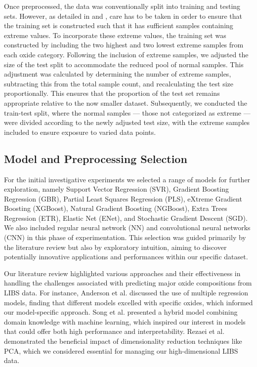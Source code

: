 Once preprocessed, the data was conventionally split into training and testing sets. 
However, as detailed in \citet{p9} and \cite{cleggRecalibrationMarsScience2017}, care has to be taken in order to ensure that the training set is constructed such that it has sufficient samples containing extreme values.
To incorporate these extreme values, the training set was constructed by including the two highest and two lowest extreme samples from each oxide category.
Following the inclusion of extreme samples, we adjusted the size of the test split to accommodate the reduced pool of normal samples. 
This adjustment was calculated by determining the number of extreme samples, subtracting this from the total sample count, and recalculating the test size proportionally. 
This ensures that the proportion of the test set remains appropriate relative to the now smaller dataset. 
Subsequently, we conducted the train-test split, where the normal samples --- those not categorized as extreme --- were divided according to the newly adjusted test size, with the extreme samples included to ensure exposure to varied data points.

\subsection{Model and Preprocessing Selection}
For the initial investigative experiments we selected a range of models for further exploration, namely Support Vector Regression (SVR), Gradient Boosting Regression (GBR), Partial Least Squares Regression (PLS), eXtreme Gradient Boosting (XGBoost), Natural Gradient Boosting (NGBoost), Extra Trees Regression (ETR), Elastic Net (ENet), and Stochastic Gradient Descent (SGD). 
We also included regular neural network (NN) and convolutional neural networks (CNN) in this phase of experimentation. 
This selection was guided primarily by the literature review but also by exploratory intuition,
aiming to discover potentially innovative applications and performances within our specific dataset.

Our literature review highlighted various approaches and their effectiveness in handling the challenges associated with predicting major oxide compositions from LIBS data. 
For instance, Anderson et al. discussed the use of multiple regression models, finding that different models excelled with specific oxides, which informed our model-specific approach. 
Song et al. presented a hybrid model combining domain knowledge with machine learning, which inspired our interest in models that could offer both high performance and interpretability. Rezaei et al. demonstrated the beneficial impact of dimensionality reduction techniques like PCA, which we considered essential for managing our high-dimensional LIBS data.

